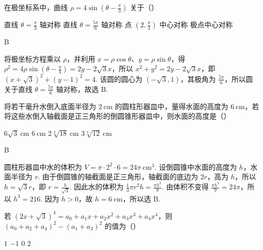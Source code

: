 \documentclass[UTF8,a4paper,oneside,11pt]{ctexbook}
\begin{document}
\begin{problem}
在极坐标系中，曲线 \(\rho=4\sin\left(\theta-\frac{\pi}{3}\right)\) 关于（\quad）

\choices
    {直线 \(\theta = \frac{\pi}{3}\) 轴对称}
    {直线 \(\theta = \frac{5\pi}{6}\) 轴对称}
    {点 \(\left(2, \frac{\pi}{3}\right)\) 中心对称}
    {极点中心对称}
\end{problem}

\begin{answer}
B
\end{answer}

\begin{solution}
将极坐标方程乘以 \(\rho\)，并利用 \(x=\rho\cos\theta\)、\(y=\rho\sin\theta\)，得
\(\rho^2=4\rho\sin\left(\theta-\frac{\pi}{3}\right)=2y-2\sqrt{3}x\)，所以
\(x^2+y^2=2y-2\sqrt{3}x\)，即
\((x+\sqrt{3})^2+(y-1)^2=4\).
该圆的圆心为 \((-\sqrt{3},1)\)，其极角为 \(\frac{5\pi}{6}\)，所以圆关于直线 \(\theta=\frac{5\pi}{6}\) 轴对称，故选 B.
\end{solution}

\begin{problem}
将若干毫升水倒入底面半径为 \(2 \mathrm{~cm}\) 的圆柱形器皿中，量得水面的高度为 \(6 \mathrm{~cm}\)，若将这些水倒入轴截面是正三角形的倒圆锥形器皿中，则水面的高度是（\quad）

\choices
    {\(6\sqrt{3} \mathrm{~cm}\)}
    {\(6 \mathrm{~cm}\)}
    {\(2\sqrt[3]{18} \mathrm{~cm}\)}
    {\(3\sqrt[3]{12} \mathrm{~cm}\)}
\end{problem}

\begin{answer}
B
\end{answer}

\begin{solution}
圆柱形器皿中水的体积为 \(V=\pi\cdot 2^2\cdot 6=24\pi\ \mathrm{cm}^3\). 设倒圆锥中水面的高度为 \(h\)，水面半径为 \(r\). 由于倒圆锥的轴截面是正三角形，轴截面的底边为 \(2r\)，高为 \(h\)，所以 \(h=\sqrt{3}r\)，即 \(r=\frac{h}{\sqrt{3}}\). 因此水的体积为 \(\frac{1}{3}\pi r^2h=\frac{\pi h^3}{9}\). 由体积不变得 \(\frac{\pi h^3}{9}=24\pi\)，所以 \(h^3=216\). 因为 \(h>0\)，故 \(h=6\ \mathrm{cm}\)，所以选 B.
\end{solution}

\begin{problem}
若 \(\left(2x + \sqrt{3}\right)^4 = a_0 + a_1x + a_2x^2 + a_3x^3 + a_4x^4\)，则 \((a_0 + a_2 + a_4)^2 - (a_1 + a_3)^2\) 的值为（\quad）

\choices
    {\(1\)}
    {\(-1\)}
    {\(0\)}
    {\(2\)}
\end{problem}
\end{document}
